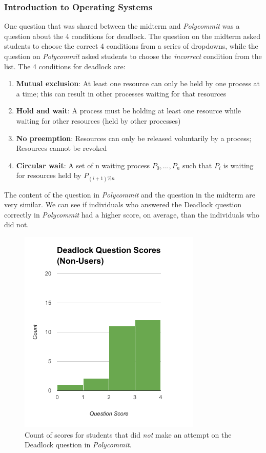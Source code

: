 \subsubsection{Introduction to Operating Systems}
One question that was shared between the midterm and \textit{Polycommit} was a question about the 4 conditions for deadlock. The question on the midterm asked students to choose the correct 4 conditions from a series of dropdowns, while the question on \textit{Polycommit} asked students to choose the \textit{incorrect} condition from the list. The 4 conditions for deadlock are:

\begin{enumerate}
	\item \textbf{Mutual exclusion}: At least one resource can only be
	held by one process at a time; this can result in other
	processes waiting for that resources
	\item \textbf{Hold and wait}: A process must be holding at least one
	resource while waiting for other resources (held by other
	processes)
	\item \textbf{No preemption}: Resources can only be released
	voluntarily by a process; Resources cannot be revoked
	\item \textbf{Circular wait}: A set of n waiting process $ {P_0, ..., P_n} $
	such that $ P_i $ is waiting for resources held by $ P_{(i+1)\%n} $
\end{enumerate}

\par The content of the question in \textit{Polycommit} and the question in the midterm are very similar. We can see if individuals who answered the Deadlock question correctly in \textit{Polycommit} had a higher score, on average, than the individuals who did not.

\begin{figure}[th!]
	\includegraphics[width=0.5\linewidth]{figures/deadlock-nonusers}
	\caption{Count of scores for students that did \textit{not} make an attempt on the Deadlock question in \textit{Polycommit}.}
	\label{fig:deadlock-no}
\end{figure}

